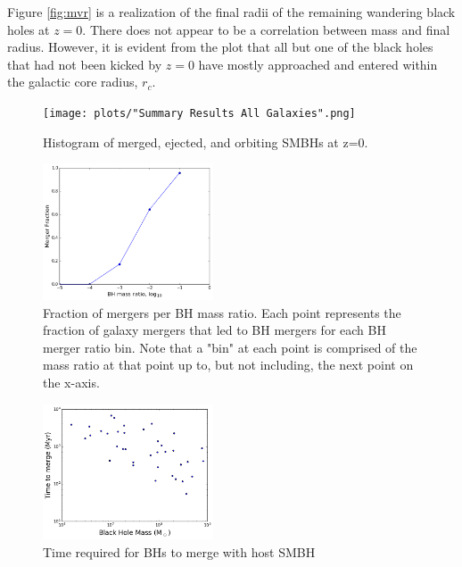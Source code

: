 \documentclass[english, apj]{emulateapj}
\begin{document}
Figure \ref{fig:mvr} is a realization of the final radii of the remaining wandering black holes at $z=0$.  There does not appear to be a correlation between mass and final radius.  However, it is evident from the plot that all but one of the black holes that had not been kicked by $z=0$ have mostly approached and entered within the galactic core radius, $r_c$.

\begin{figure}[ht]
\begin{center}
\texttt{[image: plots/"Summary Results All Galaxies".png]}
\caption{Histogram of merged, ejected, and orbiting SMBHs at z=0.}
\label{fig:meosmbh}
\end{center}
\end{figure}

\begin{figure}[ht]
\begin{center}
\includegraphics[width=0.45\textwidth]{plots/q_merger_fraction.png}
\caption{Fraction of mergers per BH mass ratio.  Each point represents the fraction of galaxy mergers that led to BH mergers for each BH merger ratio bin.  Note that a "bin" at each point is comprised of the mass ratio at that point up to, but not including, the next point on the x-axis.}
\label{fig:q_merge_fraction}
\end{center}
\end{figure}

\begin{figure}[ht]
\begin{center}
\includegraphics[width=0.45\textwidth]{plots/time_to_merge.png}
\caption{Time required for BHs to merge with host SMBH}
\label{fig:time_to_merge}
\end{center}
\end{figure}
\end{document}

